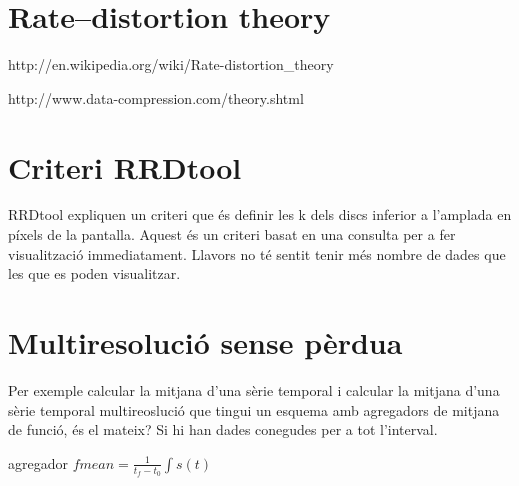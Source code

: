 





\section{Rate–distortion theory}

http://en.wikipedia.org/wiki/Rate-distortion_theory

http://www.data-compression.com/theory.shtml






\section{Criteri RRDtool}

RRDtool expliquen un criteri que és definir les k dels discs inferior a l'amplada en píxels de la pantalla. Aquest és un criteri basat en una consulta per a fer visualització immediatament. Llavors no té sentit tenir més nombre de dades que les que es poden visualitzar. 



\section{Multiresolució sense pèrdua}


Per exemple calcular la mitjana d'una sèrie temporal i calcular la mitjana d'una sèrie temporal multireoslució que tingui un esquema amb agregadors de mitjana de funció, és el mateix? Si hi han dades conegudes per a tot l'interval.

agregador $fmean = \frac{1}{t_f-t_0}\int s(t)$

